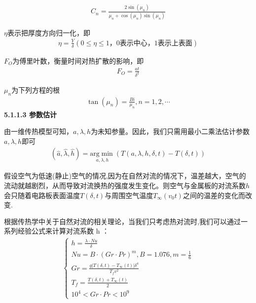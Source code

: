 \documentclass[../main.tex]{subfiles}
\begin{document}
    \begin{align}\label{1.31}
    C_n=\frac{2\sin(\mu_n)}{\mu_n+\cos(\mu_n)\sin(\mu_n)}
    \end{align}
    \par $\eta $表示把厚度方向归一化，即
    \begin{align}\label{1.32}
    \eta =\frac{Y}{\delta}\left( 0\le \eta \le 1\text{，0表示中心，1表示上表面} \right) 
    \end{align}
    \par  $F_O$为傅里叶数，衡量时间对热扩散的影响，即
    \begin{align}\label{1.33}
    F_O=\frac{at}{\delta ^2}
    \end{align}
    \par $\mu_n$为下列方程的根
    \begin{align}\label{1.34}
    \tan(\mu_n)=\frac{Bi}{\mu_n},n = 1,2,\cdots
    \end{align}
    \noindent \textbf{5.1.1.3 参数估计}
    \par 由一维传热模型可知，$a,\lambda,h$为未知参量。因此，我们只需用最小二乘法估计参数$a,\lambda,h$即可
    \begin{align}\label{4.1}
    \left( \widehat{a},\widehat{\lambda },\widehat{h} \right) =\underset{a,\lambda ,h}{\mathrm{arg}\min}\left( T\left( a,\lambda ,h,\delta,t \right) -T\left( \delta,t \right) \right) 
    \end{align}
    \par 假设空气为低速(静止)空气的情况,因为在自然对流的情况下，温差越大，空气的流动就越剧烈，从而导致对流换热的强度发生变化。则空气与金属板的对流系数$h$会只随着电路板表面温度$T(\delta,t)$与周围空气温度$ T_{\infty}(v_0t)$之间的温差的变化而改变.
    \par 根据传热学中关于自然对流的相关理论，当我们只考虑热对流时,我们可以通过一系列经验公式来计算对流系数 h ：
    \begin{align}\label{4.2}
    \left\{\begin{array}{l}
    h=\frac{\lambda \cdot Nu}{\delta}
    \\
    Nu=B \cdot \left( Gr\cdot Pr \right) ^{m},B=1.076,m=\frac{1}{6} 
    \\
    Gr=\frac{g\left| T\left( \delta,t \right) -T_{\infty}\left( t \right) \right|\delta ^4}{T_fv^2} 
    \\
    T_f=\frac{T\left( \delta,t \right) +T_{\infty}\left( t \right)}{2} 
    \\
    10^4<Gr\cdot Pr<10^9
    \end{array} \right.
    \end{align}
\end{document}
